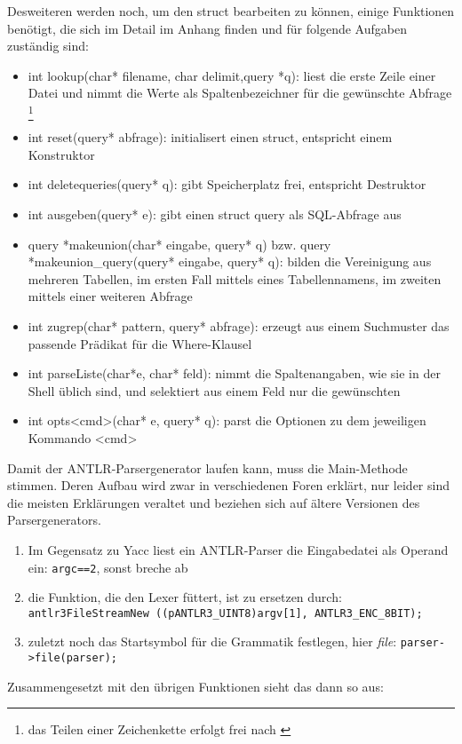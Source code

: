 Desweiteren werden noch, um den struct bearbeiten zu können, einige Funktionen benötigt, die sich im Detail im Anhang finden und für folgende Aufgaben zuständig sind:

\begin{itemize}
\item int lookup(char* filename, char delimit,query *q): liest die erste Zeile einer Datei und nimmt die Werte als Spaltenbezeichner für die gewünschte Abfrage
\footnote{das Teilen einer Zeichenkette erfolgt frei nach \cite{split}}
\item int reset(query* abfrage): initialisert einen struct, entspricht einem Konstruktor
\item int deletequeries(query* q): gibt Speicherplatz frei, entspricht Destruktor
\item int ausgeben(query* e): gibt einen struct query als SQL-Abfrage aus
\item query *makeunion(char* eingabe, query* q) bzw. query *makeunion\_query(query* eingabe, query* q): bilden die Vereinigung aus mehreren Tabellen, im ersten Fall mittels eines Tabellennamens, im zweiten mittels einer weiteren Abfrage
\item int zugrep(char* pattern, query* abfrage): erzeugt aus einem Suchmuster das passende Prädikat für die Where-Klausel
\item int parseListe(char*e, char* feld): nimmt die Spaltenangaben, wie sie in der Shell üblich sind, und selektiert aus einem Feld nur die gewünschten
\item int opts<cmd>(char* e, query* q):
parst die Optionen zu dem jeweiligen Kommando <cmd>
\end{itemize}

Damit der ANTLR-Parsergenerator laufen kann, muss die Main-Methode stimmen. Deren Aufbau wird zwar in verschiedenen Foren erklärt, nur leider sind die meisten Erklärungen veraltet und beziehen sich auf ältere Versionen des Parsergenerators. \cite{ANTLR-C}
\begin{enumerate}
\item Im Gegensatz zu Yacc liest ein ANTLR-Parser die Eingabedatei als Operand ein: \lstinline{argc==2}, sonst breche ab
\item die Funktion, die den Lexer füttert, ist zu ersetzen durch: \lstinline{antlr3FileStreamNew ((pANTLR3_UINT8)argv[1], ANTLR3_ENC_8BIT);}
\item zuletzt noch das Startsymbol für die Grammatik festlegen, hier \textit{file}: \lstinline{parser->file(parser);}
\end{enumerate}
Zusammengesetzt mit den übrigen Funktionen sieht das dann so aus:

